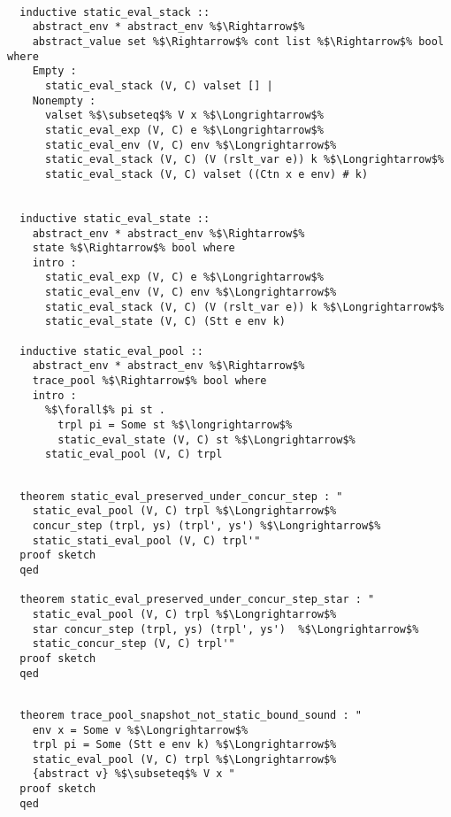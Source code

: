 \documentclass{article}
\begin{document}
\begin{lstlisting}[style=codestyle1, escapechar=\%]

  inductive static_eval_stack ::
    abstract_env * abstract_env %$\Rightarrow$%
    abstract_value set %$\Rightarrow$% cont list %$\Rightarrow$% bool where
    Empty :
      static_eval_stack (V, C) valset [] |
    Nonempty : 
      valset %$\subseteq$% V x %$\Longrightarrow$%
      static_eval_exp (V, C) e %$\Longrightarrow$%
      static_eval_env (V, C) env %$\Longrightarrow$%
      static_eval_stack (V, C) (V (rslt_var e)) k %$\Longrightarrow$%
      static_eval_stack (V, C) valset ((Ctn x e env) # k)


  inductive static_eval_state ::
    abstract_env * abstract_env %$\Rightarrow$%
    state %$\Rightarrow$% bool where
    intro :
      static_eval_exp (V, C) e %$\Longrightarrow$%
      static_eval_env (V, C) env %$\Longrightarrow$%
      static_eval_stack (V, C) (V (rslt_var e)) k %$\Longrightarrow$%
      static_eval_state (V, C) (Stt e env k)

  inductive static_eval_pool ::
    abstract_env * abstract_env %$\Rightarrow$%
    trace_pool %$\Rightarrow$% bool where
    intro :
      %$\forall$% pi st .
        trpl pi = Some st %$\longrightarrow$%
        static_eval_state (V, C) st %$\Longrightarrow$% 
      static_eval_pool (V, C) trpl

  \end{lstlisting}

\begin{lstlisting}[style=codestyle1, escapechar=\%]

  theorem static_eval_preserved_under_concur_step : "
    static_eval_pool (V, C) trpl %$\Longrightarrow$% 
    concur_step (trpl, ys) (trpl', ys') %$\Longrightarrow$%
    static_stati_eval_pool (V, C) trpl'"
  proof sketch
  qed

  theorem static_eval_preserved_under_concur_step_star : "
    static_eval_pool (V, C) trpl %$\Longrightarrow$% 
    star concur_step (trpl, ys) (trpl', ys')  %$\Longrightarrow$% 
    static_concur_step (V, C) trpl'"
  proof sketch
  qed
  \end{lstlisting}

\begin{lstlisting}[style=codestyle1, escapechar=\%]

  theorem trace_pool_snapshot_not_static_bound_sound : "
    env x = Some v %$\Longrightarrow$%
    trpl pi = Some (Stt e env k) %$\Longrightarrow$%
    static_eval_pool (V, C) trpl %$\Longrightarrow$%
    {abstract v} %$\subseteq$% V x "
  proof sketch
  qed
  \end{lstlisting}
\end{document}
